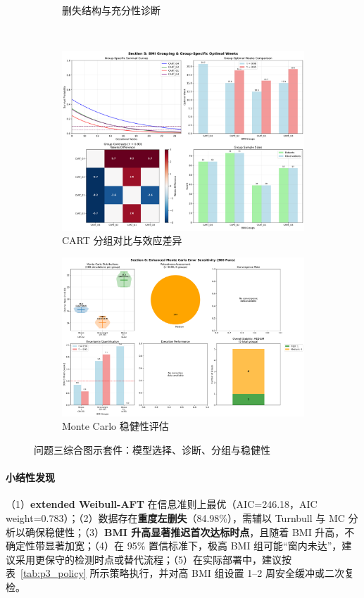 \documentclass[withoutpreface]{cumcmthesis}
\begin{document}
\begin{figure}[htbp]
\begin{subfigure}{0.48\textwidth}
  \caption{删失结构与充分性诊断}
\end{subfigure}\\[4pt]
\begin{subfigure}{0.48\textwidth}
  \centering
  \includegraphics[width=\linewidth]{output/figures/p3_section5_group_analysis.png}
  \caption{CART 分组对比与效应差异}
\end{subfigure}\hfill
\begin{subfigure}{0.48\textwidth}
  \centering
  \includegraphics[width=\linewidth]{output/figures/p3_section6_monte_carlo_analysis.png}
  \caption{Monte Carlo 稳健性评估}
\end{subfigure}
\caption{问题三综合图示套件：模型选择、诊断、分组与稳健性}
\label{fig:p3_suite}
\end{figure}

\paragraph{小结性发现}（1）\textbf{extended Weibull-AFT} 在信息准则上最优（AIC=\num{246.18}，AIC weight=\num{0.783}）；（2）数据存在\textbf{重度左删失}（\num{84.98}\%），需辅以 Turnbull 与 MC 分析以确保稳健性；（3）\textbf{BMI 升高显著推迟首次达标时点}，且随着 BMI 升高，不确定性带显著加宽；（4）在 95\% 置信标准下，极高 BMI 组可能“窗内未达”，建议采用更保守的检测时点或替代流程；（5）在实际部署中，建议按表~\ref{tab:p3_policy} 所示策略执行，并对高 BMI 组设置 1–2 周安全缓冲或二次复检。
\end{document}
